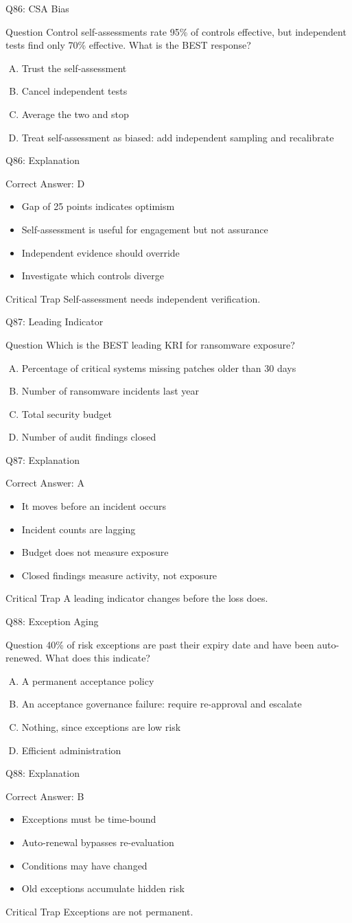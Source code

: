\documentclass[aspectratio=169]{beamer}
\newcommand{\hq}[7]{%
  \begin{frame}{Q#1: #2}
    \begin{block}{Question}
      #3
    \end{block}
    \begin{enumerate}[(A)]
      #4
    \end{enumerate}
  \end{frame}
  \begin{frame}{Q#1: Explanation}
    \begin{block}{Correct Answer: #5}
      \begin{itemize}
        #6
      \end{itemize}
    \end{block}
    \begin{alertblock}{Critical Trap}
      #7
    \end{alertblock}
  \end{frame}
}
\begin{document}
\hq{86}{CSA Bias}
{Control self-assessments rate 95\% of controls effective, but independent tests find only 70\% effective. What is the BEST response?}
{\item Trust the self-assessment
 \item Cancel independent tests
 \item Average the two and stop
 \item Treat self-assessment as biased: add independent sampling and recalibrate}
{D}
{\item Gap of 25 points indicates optimism
 \item Self-assessment is useful for engagement but not assurance
 \item Independent evidence should override
 \item Investigate which controls diverge}
{Self-assessment needs independent verification.}

\hq{87}{Leading Indicator}
{Which is the BEST leading KRI for ransomware exposure?}
{\item Percentage of critical systems missing patches older than 30 days
 \item Number of ransomware incidents last year
 \item Total security budget
 \item Number of audit findings closed}
{A}
{\item It moves before an incident occurs
 \item Incident counts are lagging
 \item Budget does not measure exposure
 \item Closed findings measure activity, not exposure}
{A leading indicator changes before the loss does.}

\hq{88}{Exception Aging}
{40\% of risk exceptions are past their expiry date and have been auto-renewed. What does this indicate?}
{\item A permanent acceptance policy
 \item An acceptance governance failure: require re-approval and escalate
 \item Nothing, since exceptions are low risk
 \item Efficient administration}
{B}
{\item Exceptions must be time-bound
 \item Auto-renewal bypasses re-evaluation
 \item Conditions may have changed
 \item Old exceptions accumulate hidden risk}
{Exceptions are not permanent.}
\end{document}
